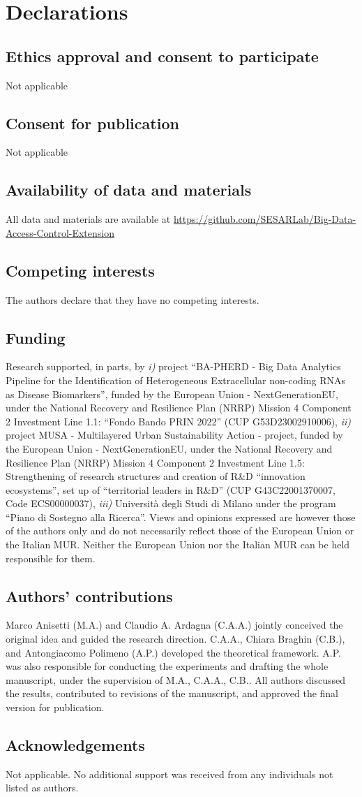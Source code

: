 \section{Declarations}
\subsection{Ethics approval and consent to participate}
Not applicable
\subsection{Consent for publication}
Not applicable
\subsection{Availability of data and materials}
All data and materials are available at \url{https://github.com/SESARLab/Big-Data-Access-Control-Extension}
\subsection{Competing interests}
The authors declare that they have no competing interests.
\subsection{Funding}
Research supported, in parts, by \emph{i)} project ``BA-PHERD - Big Data Analytics Pipeline for the Identification of Heterogeneous Extracellular non-coding RNAs as Disease Biomarkers'', funded by the European Union - NextGenerationEU, under the National Recovery and Resilience Plan (NRRP) Mission 4 Component 2 Investment Line 1.1: “Fondo Bando PRIN 2022” (CUP G53D23002910006), \emph{ii)} project MUSA - Multilayered Urban Sustainability Action - project, funded by the European Union - NextGenerationEU, under the National Recovery and Resilience Plan (NRRP) Mission 4 Component 2 Investment Line 1.5: Strengthening of research structures and creation of R\&D ``innovation ecosystems'', set up of ``territorial leaders in R\&D'' (CUP  G43C22001370007, Code ECS00000037),  \emph{iii)} Università degli Studi di Milano under the program ``Piano di Sostegno alla Ricerca''. Views and opinions expressed are however those of the authors only and do not necessarily reflect those of the European Union or the Italian MUR. Neither the European Union nor the Italian MUR can be held responsible for them.
\subsection{Authors' contributions}
Marco Anisetti (M.A.) and Claudio A. Ardagna (C.A.A.) jointly conceived the original idea and guided the research direction. C.A.A., Chiara Braghin (C.B.), and Antongiacomo Polimeno (A.P.) developed the theoretical framework. A.P. was also responsible for conducting the experiments and drafting the whole manuscript, under the supervision of M.A., C.A.A., C.B.. All authors discussed the results, contributed to revisions of the manuscript, and approved the final version for publication.

\subsection{Acknowledgements}
Not applicable. No additional support was received from any individuals not listed as authors.